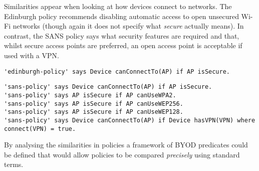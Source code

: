\documentclass{easychair}
\begin{document}
Similarities appear when looking at how devices connect to networks.
The Edinburgh policy recommends disabling automatic access to open unsecured Wi-Fi networks (though again it does not specify what \emph{secure} actually means). 
In contrast, the SANS policy says what security features are required and that, whilst secure access points are preferred, an open access point is acceptable if used with a VPN.
\begin{lstlisting}[title={\footnotesize\textbf{Edinburgh}:~\itshape ``Control your devices connections by disabling automatic connection to open, unsecured Wi-Fi networks.''}]
'edinburgh-policy' says Device canConnectTo(AP) if AP isSecure.
\end{lstlisting}
\begin{lstlisting}[title={\footnotesize\textbf{SANS}:~\itshape ``If mobile workers do require connectivity through public, open, or untrusted WLAN, then users MUST use WLANs using, if available and in this order: WPA(2) encryption, WEP 256 bits (or 128 bits), or finally open networks if nothing else is available. Users connected to data networks in an open environment MUST use a VPN connection.''}]
'sans-policy' says Device canConnectTo(AP) if AP isSecure.
'sans-policy' says AP isSecure if AP canUseWPA2.
'sans-policy' says AP isSecure if AP canUseWEP256.
'sans-policy' says AP isSecure if AP canUseWEP128.
'sans-policy' says Device canConnectTo(AP) if Device hasVPN(VPN) where connect(VPN) = true.
\end{lstlisting}
By analysing the similarities in policies a framework of BYOD predicates could be defined that would allow policies to be compared \emph{precisely} using standard terms.
\end{document}
